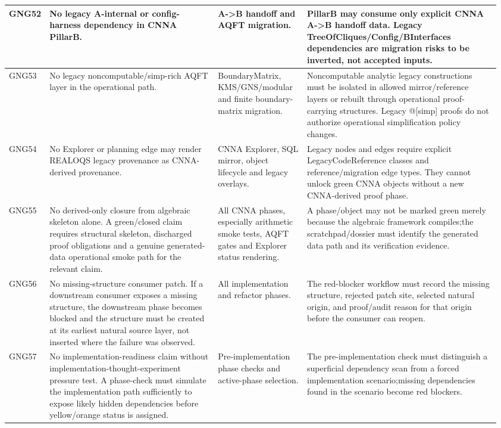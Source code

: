 \begin{longtable}{L{0.045\linewidth} L{0.345\linewidth} L{0.185\linewidth} L{0.39\linewidth}}
\hline
\addlinespace[0.24em]
GNG52 & No legacy A-internal or config-harness dependency in CNNA PillarB. & A->B handoff and AQFT migration. & PillarB may consume only explicit CNNA A->B handoff data. Legacy TreeOfCliques/\allowbreak{}Config/\allowbreak{}BInterfaces dependencies are migration risks to be inverted, not accepted inputs.\\
\hline
\addlinespace[0.24em]
GNG53 & No legacy noncomputable/\allowbreak{}simp-rich AQFT layer in the operational path. & BoundaryMatrix, KMS/\allowbreak{}GNS/\allowbreak{}modular and finite boundary-matrix migration. & Noncomputable analytic legacy constructions must be isolated in allowed mirror/\allowbreak{}reference layers or rebuilt through operational proof-carrying structures. Legacy @[simp] proofs do not authorize operational simplification policy changes.\\
\hline
\addlinespace[0.24em]
GNG54 & No Explorer or planning edge may render REALOQS legacy provenance as CNNA-derived provenance. & CNNA Explorer, SQL mirror, object lifecycle and legacy overlays. & Legacy nodes and edges require explicit LegacyCodeReference classes and reference/\allowbreak{}migration edge types. They cannot unlock green CNNA objects without a new CNNA-derived proof phase.\\
\hline
\addlinespace[0.24em]
GNG55 & No derived-only closure from algebraic skeleton alone. A green/\allowbreak{}closed claim requires structural skeleton, discharged proof obligations and a genuine generated-data operational smoke path for the relevant claim. & All CNNA phases, especially arithmetic smoke tests, AQFT gates and Explorer status rendering. & A phase/\allowbreak{}object may not be marked green merely because the algebraic framework compiles;\newline the scratchpad/\allowbreak{}dossier must identify the generated data path and its verification evidence.\\
\hline
\addlinespace[0.24em]
GNG56 & No missing-structure consumer patch. If a downstream consumer exposes a missing structure, the downstream phase becomes blocked and the structure must be created at its earliest natural source layer, not inserted where the failure was observed. & All implementation and refactor phases. & The red-blocker workflow must record the missing structure, rejected patch site, selected natural origin, and proof/\allowbreak{}audit reason for that origin before the consumer can reopen.\\
\hline
\addlinespace[0.24em]
GNG57 & No implementation-readiness claim without implementation-thought-experiment pressure test. A phase-check must simulate the implementation path sufficiently to expose likely hidden dependencies before yellow/\allowbreak{}orange status is assigned. & Pre-implementation phase checks and active-phase selection. & The pre-implementation check must distinguish a superficial dependency scan from a forced implementation scenario;\newline missing dependencies found in the scenario become red blockers.\\

\end{longtable}
